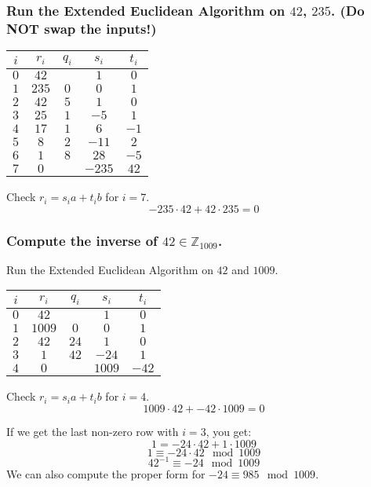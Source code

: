\documentclass{article}
\newcommand{\Z}{\mathbb{Z}}
\begin{document}
  \subsubsection{Run the Extended Euclidean Algorithm on $42$, $235$. (Do NOT swap the inputs!)}
  \begin{center}
    \begin{tabular}{c|cccc}
      $i$ & $r_i$ & $q_i$ & $s_i$ & $t_i$ \\
      \hline
      $0$ & $42$ &  & $1$ & $0$ \\
      $1$ & $235$ & $0$ & $0$ & $1$ \\
      $2$ & $42$ & $5$ & $1$ & $0$ \\
      $3$ & $25$ & $1$ & $-5$ & $1$ \\
      $4$ & $17$ & $1$ & $6$ & $-1$ \\
      $5$ & $8$ & $2$ & $-11$ & $2$ \\
      $6$ & $1$ & $8$ & $28$ & $-5$ \\
      $7$ & $0$ &  & $-235$ & $42$ \\
    \end{tabular}
  \end{center}
  Check $r_i = s_ia + t_ib$ for $i = 7$.
  \[ -235 \cdot 42 + 42 \cdot 235 = 0 \]

  \subsubsection{Compute the inverse of $42 \in \Z_{1009}$.}
  Run the Extended Euclidean Algorithm on $42$ and $1009$.
  \begin{center}
    \begin{tabular}{c|cccc}
      $i$ & $r_i$ & $q_i$ & $s_i$ & $t_i$ \\
      \hline
      $0$ & $42$ &  & $1$ & $0$ \\
      $1$ & $1009$ & $0$ & $0$ & $1$ \\
      $2$ & $42$ & $24$ & $1$ & $0$ \\
      $3$ & $1$ & $42$ & $-24$ & $1$ \\
      $4$ & $0$ &  & $1009$ & $-42$ \\
    \end{tabular}
  \end{center}
  Check $r_i = s_ia + t_ib$ for $i = 4$.
  \[ 1009 \cdot 42 + -42 \cdot 1009 = 0 \]

  If we get the last non-zero row with $i = 3$, you get:
  \[ 1 = -24 \cdot 42 + 1 \cdot 1009 \]
  \[ 1 \equiv -24 \cdot 42 \mod 1009 \]
  \[ 42^{-1} \equiv -24 \mod 1009 \]
  We can also compute the proper form for $-24 \equiv 985 \mod 1009$.
\end{document}

